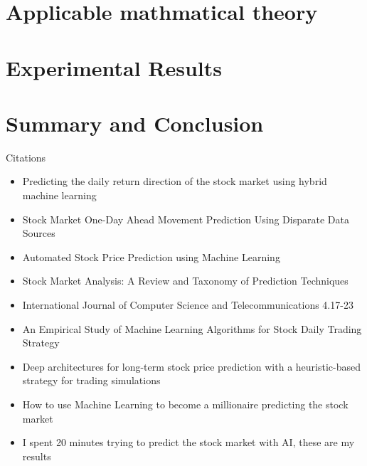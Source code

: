 \documentclass[conference]{IEEEtran}
\begin{document}
\section{Applicable mathmatical theory}

\section{Experimental Results}

\section{Summary and Conclusion}


Citations
\begin{itemize}
\item Predicting the daily return direction of the stock market using hybrid machine learning\cite{DailyReturnDirection}
\item Stock Market One-Day Ahead Movement Prediction Using Disparate Data Sources\cite {Onedayahead}
\item Automated Stock Price Prediction using Machine Learning \cite{AutomatedPrediction}
\item Stock Market Analysis: A Review and Taxonomy of Prediction Techniques \cite{TaxonomyofPrediction}
\item International Journal of Computer Science and Telecommunications 4.17-23 \cite {MLModelPrediction}
\item An Empirical Study of Machine Learning Algorithms for Stock Daily Trading Strategy \cite{EmpiricalStudy}
\item Deep architectures for long-term stock price prediction with a heuristic-based strategy for trading simulations \cite{LongTermPricePrediction}
\item How to use Machine Learning to become a millionaire predicting the stock market \cite{WebBecomeMillionaire}
\item I spent 20 minutes trying to predict the stock market with AI, these are my results \cite{20MinStockPredict}
\end{itemize}





\vspace{12pt}
\end{document}

